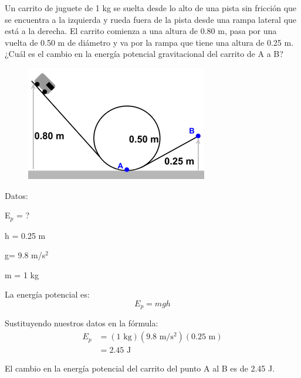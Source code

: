 Un carrito de juguete de 1 kg se suelta desde lo alto de una pista sin fricción que se encuentra a la izquierda y rueda fuera de la pista desde una rampa lateral que está a la derecha. El carrito comienza a una altura de 0.80 m, pasa por una vuelta de 0.50 m de diámetro y va por la rampa que tiene una altura de 0.25 m. ¿Cuál es el cambio en la energía potencial gravitacional del carrito de A a B?

\begin{minipage}{0.3\textwidth}
    \begin{figure}[H]
        \includegraphics[width=\linewidth]{../images/7980f50fa259419a9906dd2f6217493f5d8c6969}
    \end{figure}
\end{minipage}\hfill
\begin{minipage}{0.65\textwidth}
    \begin{solutionbox}{5.3cm}
        \begin{multicols}{2}
            Datos:

            E$_p$ = ?

            h = 0.25 m

            g= 9.8 m/s$^2$

            m = 1 kg

            La energía potencial es:
            \[E_p=mgh\]

            \vspace{2cm}

            Sustituyendo nuestros datos en la fórmula:
            \[
                \begin{array}{rl}
                    E_p & = (1 \text{ kg})(9.8 \text{ m/s$^2$})(0.25 \text{ m}) \\[1em]
                        & =2.45 \text{ J }
                \end{array}
            \]

        \end{multicols}
        \begin{center}El cambio en la energía potencial del carrito del punto A al B es de 2.45 J.\end{center}
    \end{solutionbox}
\end{minipage}